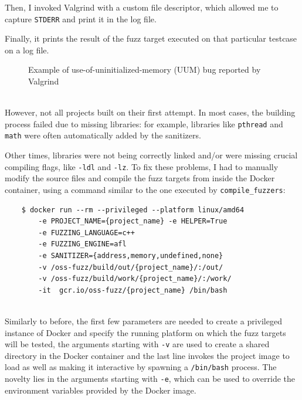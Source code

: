 Then, I invoked Valgrind with a custom file descriptor, which allowed me to capture \verb|STDERR| and print it in the log file.

Finally, it prints the result of the fuzz target executed on that particular testcase on a log file.

\begin{figure}[h]
\caption{Example of use-of-uninitialized-memory (UUM) bug reported by Valgrind}
\label{fig:valgrind_example}
\end{figure}
\ \\



However, not all projects built on their first attempt.
In most cases, the building process failed due to missing libraries: for example, libraries like \verb|pthread| and \verb|math| were often automatically added by the sanitizers.

Other times, libraries were not being correctly linked and/or were missing crucial compiling flags, like \verb|-ldl| and \verb|-lz|.
To fix these problems, I had to manually modify the source files and compile the fuzz targets from inside the Docker container, using a command similar to the one executed by \verb|compile_fuzzers|:
\begin{verbatim}
    $ docker run --rm --privileged --platform linux/amd64 
        -e PROJECT_NAME={project_name} -e HELPER=True 
        -e FUZZING_LANGUAGE=c++ 
        -e FUZZING_ENGINE=afl 
        -e SANITIZER={address,memory,undefined,none} 
        -v /oss-fuzz/build/out/{project_name}/:/out/   
        -v /oss-fuzz/build/work/{project_name}/:/work/
        -it  gcr.io/oss-fuzz/{project_name} /bin/bash
\end{verbatim}
\ \\
Similarly to before, the first few parameters are needed to create a privileged instance of Docker and specify the running platform on which the fuzz targets will be tested, the arguments starting with \verb|-v| are used to create a shared directory in the Docker container and the last line invokes the project image to load as well as making it interactive by spawning a \verb|/bin/bash| process.
The novelty lies in the arguments starting with \verb|-e|, which can be used to override the environment variables provided by the Docker image.

